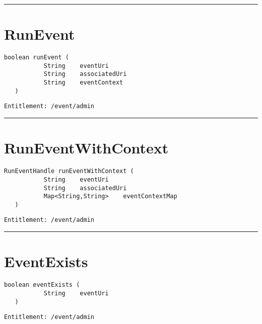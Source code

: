 \rule{12cm}{2pt}
\section{RunEvent}
\label{Api:RunEvent}
\begin{lstlisting}[style=nonumbers]
   boolean runEvent (
           String    eventUri
           String    associatedUri
           String    eventContext
   )
\end{lstlisting}
\begin{Verbatim}[formatcom=\color{Maroon}]
  Entitlement: /event/admin
\end{Verbatim}



\rule{12cm}{2pt}
\section{RunEventWithContext}
\label{Api:RunEventWithContext}
\begin{lstlisting}[style=nonumbers]
   RunEventHandle runEventWithContext (
           String    eventUri
           String    associatedUri
           Map<String,String>    eventContextMap
   )
\end{lstlisting}
\begin{Verbatim}[formatcom=\color{Maroon}]
  Entitlement: /event/admin
\end{Verbatim}



\rule{12cm}{2pt}
\section{EventExists}
\label{Api:EventExists}
\begin{lstlisting}[style=nonumbers]
   boolean eventExists (
           String    eventUri
   )
\end{lstlisting}
\begin{Verbatim}[formatcom=\color{Maroon}]
  Entitlement: /event/admin
\end{Verbatim}



